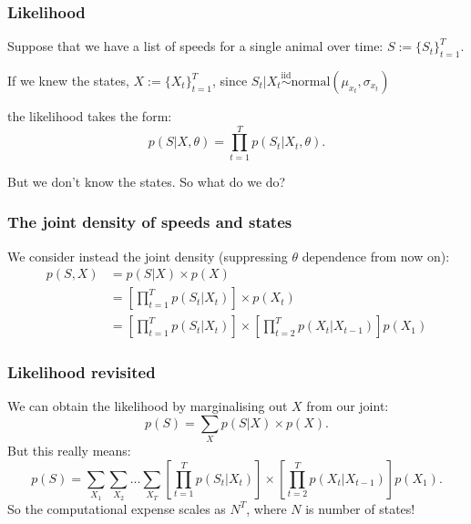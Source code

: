 \documentclass[main.tex]{subfiles}
\begin{document}
\begin{frame}
\frametitle{Likelihood}

Suppose that we have a list of speeds for a single animal over time: $S:=\{S_t\}_{t=1}^T$.

\vspace{0.5cm}

If we knew the states, $X:=\{X_t\}_{t=1}^T$, since $S_t | X_t \overset{\text{iid}}{\sim} \text{normal}(\mu_{x_t}, \sigma_{x_t})$


the likelihood takes the form:
%
\begin{equation}
    p(S|X,\theta) = \prod_{t=1}^T p(S_t | X_t, \theta).
\end{equation}

But we don't know the states. So what do we do?
    
\end{frame}

\begin{frame}
\frametitle{The joint density of speeds and states}

We consider instead the joint density (suppressing $\theta$ dependence from now on):
%
\begin{equation}
    \begin{aligned}
    p(S, X) &= p(S|X) \times p(X)\\
    &= \left[\prod_{t=1}^T p(S_t | X_t)\right] \times p(X_t)\\
    &= \left[\prod_{t=1}^T p(S_t | X_t)\right] \times \left[\prod_{t=2}^T p(X_t | X_{t-1})\right] p(X_1)
    \end{aligned}
\end{equation}
    
\end{frame}

\begin{frame}
\frametitle{Likelihood revisited}

We can obtain the likelihood by marginalising out $X$ from our joint:
%
\begin{equation}
    p(S) = \sum_X p(S|X) \times p(X).
\end{equation}
%
But this really means:
%
\begin{equation}
    p(S) = \sum_{X_1}\sum_{X_2}...\sum_{X_T}\left[\prod_{t=1}^T p(S_t | X_t)\right] \times \left[\prod_{t=2}^T p(X_t | X_{t-1})\right] p(X_1).
\end{equation}
%
So the computational expense scales as $N^T$, where $N$ is number of states!
    
\end{frame}
\end{document}
